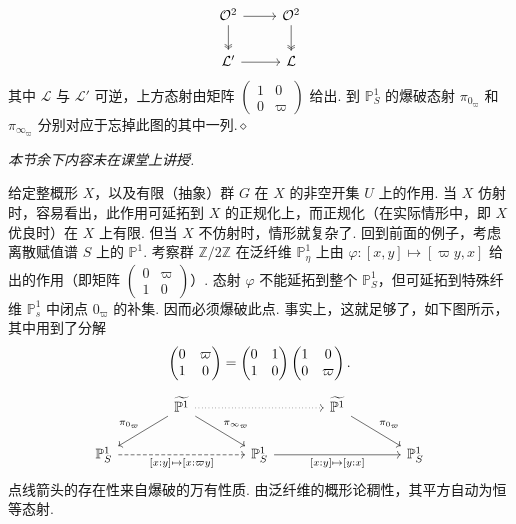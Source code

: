 \begin{example}
\begin{align*}
\begin{tikzcd}[ampersand replacement=\&]
\mathcal O^2\arrow[r]\arrow[d,two heads] \& \mathcal O^2\arrow[d,two heads] \\
\mathcal L'\arrow[r] \& \mathcal L
\end{tikzcd}
\end{align*}
其中 $\mathcal L$ 与 $\mathcal L'$ 可逆，上方态射由矩阵 $\left(\begin{smallmatrix}1&0\\0&\varpi\end{smallmatrix}\right)$ 给出. 到 $\mathbb P_S^1$ 的爆破态射 $\pi_{0_{\varpi}}$ 和 $\pi_{\infty_{\varpi}}$ 分别对应于忘掉此图的其中一列.\unskip\nobreak\hfill\ensuremath{\diamond}
\renewcommand{\envenddiamond}{}%
\end{example}
\emph{本节余下内容未在课堂上讲授.}
\begin{numpara}[群作用的延拓]\label{item:ag-2-3-4}
给定整概形 $X$，以及有限（抽象）群 $G$ 在 $X$ 的非空开集 $U$ 上的作用. 当 $X$ 仿射时，容易看出，此作用可延拓到 $X$ 的正规化上，而正规化（在实际情形中，即 $X$ 优良时）在 $X$ 上有限. 但当 $X$ 不仿射时，情形就复杂了.
回到前面的例子，考虑离散赋值谱 $S$ 上的 $\mathbb P^1$. 考察群 $\mathbb Z/2\mathbb Z$ 在泛纤维 $\mathbb P_\eta^1$ 上由 $\varphi:[x,y]\mapsto[\varpi y,x]$ 给出的作用（即矩阵 $\left(\begin{smallmatrix}0&\varpi\\1&0\end{smallmatrix}\right)$）. 态射 $\varphi$ 不能延拓到整个 $\mathbb P_S^1$，但可延拓到特殊纤维 $\mathbb P_s^1$ 中闭点 $0_{\varpi}$ 的补集. 因而必须爆破此点. 事实上，这就足够了，如下图所示，其中用到了分解
\begin{align*}
\begin{gathered}
\begin{pmatrix}0&\varpi\\1&0\end{pmatrix}=\begin{pmatrix}0&1\\1&0\end{pmatrix}\begin{pmatrix}1&0\\0&\varpi\end{pmatrix}.\\[4pt]
\begin{tikzcd}[ampersand replacement=\&,column sep=large]
\& \widetilde{\mathbb P^1}\arrow[dl,"\pi_{0_{\varpi}}"']\arrow[dr,"\pi_{\infty_{\varpi}}"]\arrow[rr,dotted] \& \& \widetilde{\mathbb P^1}\arrow[dr,"\pi_{0_{\varpi}}"] \& \\
\mathbb P_S^1\arrow[rr,dashed,"{[x:y]\mapsto[x:\varpi y]}"'] \& \& \mathbb P_S^1\arrow[rr,"{[x:y]\mapsto[y:x]}"'] \& \& \mathbb P_S^1
\end{tikzcd}
\end{gathered}
\end{align*}
点线箭头的存在性来自爆破的万有性质. 由泛纤维的概形论稠性，其平方自动为恒等态射.
\end{numpara}
